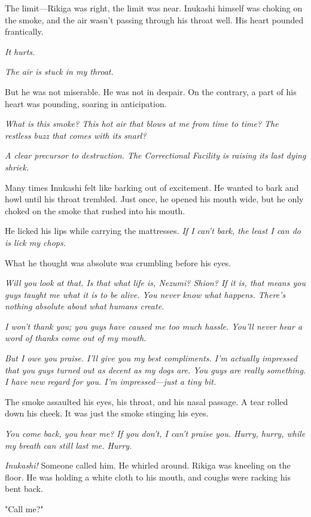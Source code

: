 The limit---Rikiga was right, the limit was near. Inukashi himself was
choking on the smoke, and the air wasn't passing through his throat
well. His heart pounded frantically.

\emph{It hurts.}

\emph{The air is stuck in my throat.}

But he was not miserable. He was not in despair. On the contrary, a part
of his heart was pounding, soaring in anticipation.

\emph{What is this smoke? This hot air that blows at me from time to time? The
restless buzz that comes with its snarl?}

\emph{A clear precursor to destruction. The Correctional Facility is raising
its last dying shriek.}

Many times Inukashi felt like barking out of excitement. He wanted to
bark and howl until his throat trembled. Just once, he opened his mouth
wide, but he only choked on the smoke that rushed into his mouth.

He licked his lips while carrying the mattresses. \emph{If I can't bark, the
least I can do is lick my chops.}

What he thought was absolute was crumbling before his eyes.

\emph{Will you look at that. Is that what life is, Nezumi? Shion? If it is,
that means you guys taught me what it is to be alive. You never know
what happens. There's nothing absolute about what humans create.}

\emph{I won't thank you; you guys have caused me too much hassle. You'll never
hear a word of thanks come out of my mouth.}

\emph{But I owe you praise. I'll give you my best compliments. I'm actually
impressed that you guys turned out as decent as my dogs are. You guys
are really something. I have new regard for you. I'm impressed---just a
tiny bit.}

The smoke assaulted his eyes, his throat, and his nasal passage. A tear
rolled down his cheek. It was just the smoke stinging his eyes.

\emph{You come back, you hear me? If you don't, I can't praise you. Hurry,
hurry, while my breath can still last me. Hurry.}

\emph{Inukashi!} Someone called him. He whirled around. Rikiga was kneeling on
the floor. He was holding a white cloth to his mouth, and coughs were
racking his bent back.

"Call me?"

